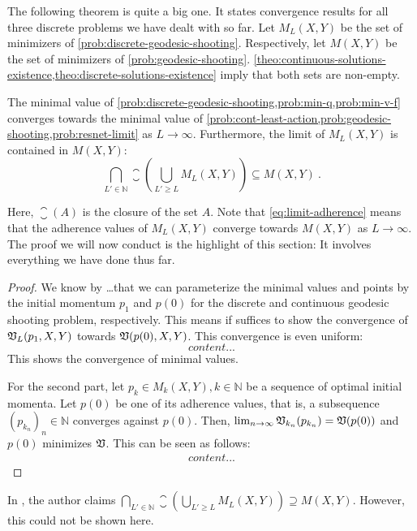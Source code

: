 The following theorem is quite a big one.
It states convergence results for all three discrete problems we have dealt with so far.
Let $M_L(X, Y)$ be the set of minimizers of \cref{prob:discrete-geodesic-shooting}.
Respectively, let $M(X, Y)$ be the set of minimizers of \cref{prob:geodesic-shooting}.
\cref{theo:continuous-solutions-existence,theo:discrete-solutions-existence} imply that both sets are non-empty.
\begin{theorem}
	\label{theo:problem-convergence}
	The minimal value of \cref{prob:discrete-geodesic-shooting,prob:min-q,prob:min-v-f} converges towards the minimal value of \cref{prob:cont-least-action,prob:geodesic-shooting,prob:resnet-limit} as $L \rightarrow \infty$.
	Furthermore, the limit of $M_L(X, Y)$ is contained in $M(X, Y)$:
	\begin{equation}
	\label{eq:limit-adherence}
		\bigcap_{L' \in \mathbb{N}} \closure\left(\bigcup_{L' \geq L} M_L(X, Y)\right) \subseteq M(X, Y) \ .
	\end{equation}
\end{theorem}
Here, $\closure (A)$ is the closure of the set $A$.
Note that \cref{eq:limit-adherence} means that the adherence values of $M_L(X, Y)$ converge towards $M(X, Y)$ as $L \rightarrow \infty$.
The proof we will now conduct is the highlight of this section:
It involves everything we have done thus far.
\begin{proof}
	We know by \dots that we can parameterize the minimal values and points by the initial momentum $p_1$ and $p(0)$ for the discrete and continuous geodesic shooting problem, respectively.
	This means if suffices to show the convergence of $\mathfrak{V}_L(p_1, X, Y)$ towards $\mathfrak{V}(p(0), X, Y)$.
	This convergence is even uniform:
	\begin{equation}
		content...
	\end{equation}
	This shows the convergence of minimal values.
	
	For the second part, let $p_k \in M_k(X, Y), k \in \mathbb{N}$ be a sequence of optimal initial momenta.
	Let $p(0)$ be one of its adherence values, that is, a subsequence $(p_{k_n})_n \in \mathbb{N}$ converges against $p(0)$.
	Then, $\lim_{n\rightarrow \infty} \mathfrak{V}_{k_n}(p_{k_n}) = \mathfrak{V}(p(0))$ and $p(0)$ minimizes $\mathfrak{V}$.
	This can be seen as follows:
	\begin{align}
		content...
	\end{align}
\end{proof}

In \cite{owhadi20}, the author claims $\bigcap_{L' \in \mathbb{N}} \closure\left(\bigcup_{L' \geq L} M_L(X, Y)\right) \supseteq M(X, Y)$.
However, this could not be shown here.